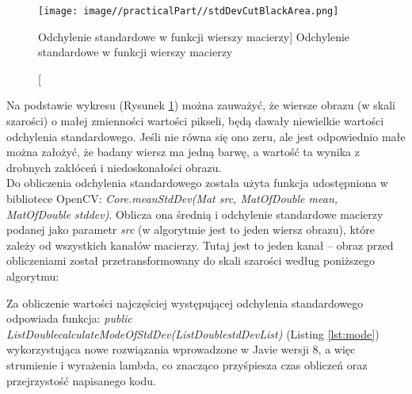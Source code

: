 \documentclass[a4paper,12pt]{article}
\begin{document}
		        
		        \newpage
		        
			    
    			\begin{figure}[!ht]  
    			    \begin{center}
    				    \texttt{[image: image//practicalPart//stdDevCutBlackArea.png]} 
    			    \end{center}
    			    \caption
            			[Odchylenie standardowe w funkcji wierszy macierzy] 
            			{Odchylenie standardowe w funkcji wierszy macierzy}  
            			\label{fig:stdDevAndLine}
    		    \end{figure}
			
    			Na podstawie wykresu (Rysunek \ref{fig:stdDevAndLine}) można zauważyć, że wiersze obrazu (w skali szarości) o małej zmienności wartości pikseli, będą dawały niewielkie wartości odchylenia standardowego. Jeśli nie równa się ono zeru, ale jest odpowiednio małe można założyć, że badany wiersz ma jedną barwę, a wartość ta wynika z drobnych zakłóceń i niedoskonałości obrazu.\\
    			
    			Do obliczenia odchylenia standardowego została użyta funkcja udostępniona w bibliotece OpenCV:\textit { Core.meanStdDev(Mat src, MatOfDouble mean, MatOfDouble stddev)}. Oblicza ona średnią i odchylenie standardowe macierzy podanej jako parametr \textit{src} (w algorytmie jest to jeden wiersz obrazu), które zależy od wszystkich kanałów macierzy. Tutaj jest to jeden kanał -- obraz przed obliczeniami został przetransformowany do skali szarości według poniższego algorytmu:
		 		\newline
			    		
    			 		
    			Za obliczenie wartości najczęściej występującej odchylenia standardowego odpowiada funkcja: \textit {public List\guilsinglleft Double\guilsinglright calculateModeOfStdDev(List\guilsinglleft Double\guilsinglright stdDevList)} (Listing \ref{lst:mode})
    			wykorzystująca nowe rozwiązania wprowadzone w Javie wersji 8, a więc strumienie i wyrażenia lambda, co znacząco przyśpiesza czas obliczeń oraz przejrzystość napisanego kodu. 
    			\newline
			
\end{document}
